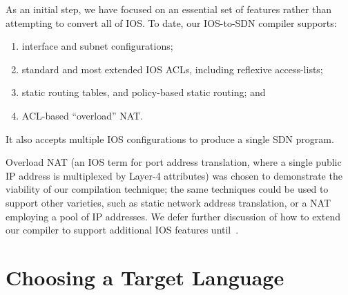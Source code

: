 As an initial step, we have focused on an essential set of
features rather than attempting to convert all of IOS. To date, our IOS-to-SDN
compiler supports:
\begin{enumerate}
\item interface and subnet configurations;
\item standard and most extended IOS ACLs, including reflexive access-lists;
\item static routing tables, and policy-based static routing; and
\item ACL-based ``overload'' NAT.
\end{enumerate}
It also accepts multiple IOS configurations to produce a single SDN program.

Overload NAT (an IOS term for port address translation, where a single public
IP address is multiplexed by Layer-4 attributes) was chosen to demonstrate the
viability of our compilation technique; the same techniques could be used to
support other varieties, such as static network address translation, or a NAT
employing a pool of IP addresses. We defer further discussion of how to extend our
compiler to support additional IOS features until~.




\section{Choosing a Target Language}
\label{sec:target}

